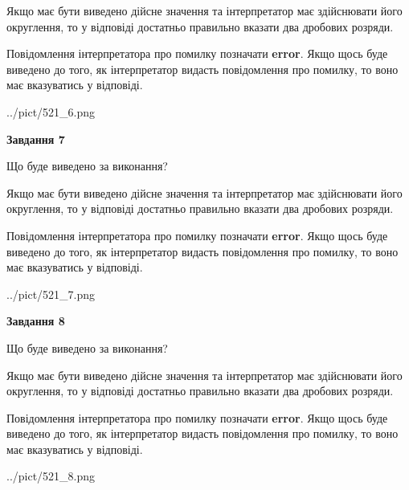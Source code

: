 \documentclass[12pt, ukrainian]{article}
\begin{document}
{\begin {Large}
Якщо має бути виведено дійсне значення та інтерпретатор має здійснювати його округлення, 
то у відповіді достатньо правильно вказати два дробових розряди.

Повідомлення інтерпретатора про помилку позначати \textbf{error}.
Якщо щось буде виведено до того, як інтерпретатор видасть повідомлення про помилку, 
то воно має вказуватись у відповіді. \par

\begin{center}
	{../pict/521_6.png}
\end{center}
\newpage

{\begin {center}\textbf{Завдання 7}\end {center}}\par
Що буде виведено за виконання? \par

Якщо має бути виведено дійсне значення та інтерпретатор має здійснювати його округлення, 
то у відповіді достатньо правильно вказати два дробових розряди.

Повідомлення інтерпретатора про помилку позначати \textbf{error}.
Якщо щось буде виведено до того, як інтерпретатор видасть повідомлення про помилку, 
то воно має вказуватись у відповіді. \par

\begin{center}
	{../pict/521_7.png}
\end{center}
\newpage

{\begin {center}\textbf{Завдання 8}\end {center}}\par
Що буде виведено за виконання? \par

Якщо має бути виведено дійсне значення та інтерпретатор має здійснювати його округлення, 
то у відповіді достатньо правильно вказати два дробових розряди.

Повідомлення інтерпретатора про помилку позначати \textbf{error}.
Якщо щось буде виведено до того, як інтерпретатор видасть повідомлення про помилку, 
то воно має вказуватись у відповіді. \par

\begin{center}
	{../pict/521_8.png}
\end{center}
\newpage


\end{Large}}
\end{document}

